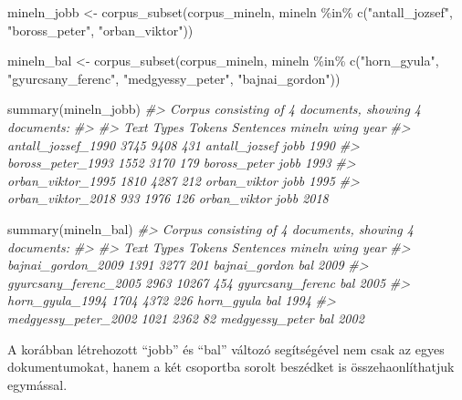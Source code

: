\documentclass[
]{book}
\newenvironment{Shaded}{\begin{snugshade}}{\end{snugshade}}
\newcommand{\CommentTok}[1]{\textcolor[rgb]{0.56,0.35,0.01}{\textit{#1}}}
\newcommand{\FunctionTok}[1]{\textcolor[rgb]{0.00,0.00,0.00}{#1}}
\newcommand{\NormalTok}[1]{#1}
\newcommand{\OtherTok}[1]{\textcolor[rgb]{0.56,0.35,0.01}{#1}}
\newcommand{\SpecialCharTok}[1]{\textcolor[rgb]{0.00,0.00,0.00}{#1}}
\newcommand{\StringTok}[1]{\textcolor[rgb]{0.31,0.60,0.02}{#1}}
\begin{document}
\begin{Shaded}
\begin{Highlighting}[]

\NormalTok{mineln\_jobb }\OtherTok{\textless{}{-}} \FunctionTok{corpus\_subset}\NormalTok{(corpus\_mineln, mineln }\SpecialCharTok{\%in\%} \FunctionTok{c}\NormalTok{(}\StringTok{"antall\_jozsef"}\NormalTok{, }\StringTok{"boross\_peter"}\NormalTok{, }
    \StringTok{"orban\_viktor"}\NormalTok{))}

\NormalTok{mineln\_bal }\OtherTok{\textless{}{-}} \FunctionTok{corpus\_subset}\NormalTok{(corpus\_mineln, mineln }\SpecialCharTok{\%in\%} \FunctionTok{c}\NormalTok{(}\StringTok{"horn\_gyula"}\NormalTok{, }\StringTok{"gyurcsany\_ferenc"}\NormalTok{, }
    \StringTok{"medgyessy\_peter"}\NormalTok{, }\StringTok{"bajnai\_gordon"}\NormalTok{))}

\FunctionTok{summary}\NormalTok{(mineln\_jobb)}
\CommentTok{\#\textgreater{} Corpus consisting of 4 documents, showing 4 documents:}
\CommentTok{\#\textgreater{} }
\CommentTok{\#\textgreater{}                Text Types Tokens Sentences        mineln wing year}
\CommentTok{\#\textgreater{}  antall\_jozsef\_1990  3745   9408       431 antall\_jozsef jobb 1990}
\CommentTok{\#\textgreater{}   boross\_peter\_1993  1552   3170       179  boross\_peter jobb 1993}
\CommentTok{\#\textgreater{}   orban\_viktor\_1995  1810   4287       212  orban\_viktor jobb 1995}
\CommentTok{\#\textgreater{}   orban\_viktor\_2018   933   1976       126  orban\_viktor jobb 2018}

\FunctionTok{summary}\NormalTok{(mineln\_bal)}
\CommentTok{\#\textgreater{} Corpus consisting of 4 documents, showing 4 documents:}
\CommentTok{\#\textgreater{} }
\CommentTok{\#\textgreater{}                   Text Types Tokens Sentences           mineln wing year}
\CommentTok{\#\textgreater{}     bajnai\_gordon\_2009  1391   3277       201    bajnai\_gordon  bal 2009}
\CommentTok{\#\textgreater{}  gyurcsany\_ferenc\_2005  2963  10267       454 gyurcsany\_ferenc  bal 2005}
\CommentTok{\#\textgreater{}        horn\_gyula\_1994  1704   4372       226       horn\_gyula  bal 1994}
\CommentTok{\#\textgreater{}   medgyessy\_peter\_2002  1021   2362        82  medgyessy\_peter  bal 2002}
\end{Highlighting}
\end{Shaded}

A korábban létrehozott ``jobb'' és ``bal'' változó segítségével nem csak
az egyes dokumentumokat, hanem a két csoportba sorolt beszédket is
összehaonlíthatjuk egymással.
\end{document}
